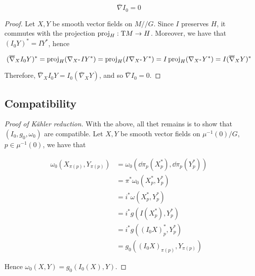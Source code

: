 \documentclass{article}
\newcommand{\sslash}{/\!/}
\begin{document}
\begin{lemma}
    \[\overline\nabla I_0 = 0\]
\end{lemma}

\begin{proof}
    Let \(X, Y\) be smooth vector fields on \(M \sslash G\). Since \(I\) preserves \(H\), it commutes with the projection \(\operatorname{proj}_H : \mathrm{T} M \to H\). Moreover, we have that \((I_0Y)^* = IY^*\), hence

    \[(\overline\nabla_X I_0Y)^* = \operatorname{proj}_H(\nabla_{X^*}IY^*) = \operatorname{proj}_H(I\nabla_{X^*}Y^*) = I\operatorname{proj}_H(\nabla_{X^*}Y^*) = I(\overline\nabla_XY)^*\]

    Therefore, \(\overline\nabla_XI_0Y = I_0(\overline\nabla_XY)\), and so \(\overline \nabla I_0 = 0\).
\end{proof}

\subsection{Compatibility}

\begin{proof}
    [Proof of K\"ahler reduction] With the above, all thet remains is to show that \((I_0, g_0, \omega_0)\) are compatible. Let \(X, Y\) be smooth vector fields on \(\mu^{-1}(0)/G\), \(p \in \mu^{-1}(0)\), we have that

    \begin{align*}
        \omega_0(X_{\pi(p)}, Y_{\pi(p)}) &= \omega_0(\dd\pi_p(X_p^*), \dd\pi_p(Y_p^*)) \\
        &= \pi^*\omega_0(X_p^*, Y_p^*) \\
        &= i^*\omega(X_p^*, Y_p^*) \\
        &= i^*g(I(X_p^*), Y_p^*) \\
        &= i^*g((I_0X)^*_p, Y_p^*) \\
        &= g_0((I_0X)_{\pi(p)}, Y_{\pi(p)})
    \end{align*}

    Hence \(\omega_0(X, Y) = g_0(I_0(X), Y)\).
\end{proof}
\end{document}
